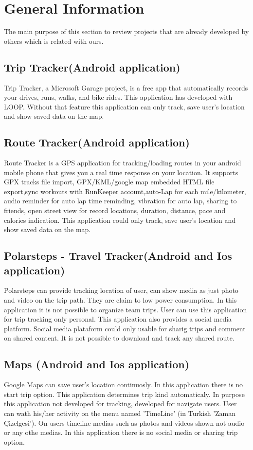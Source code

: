\chapter{General Information}
The main purpose of this section to review projects that are already developed by others which is related with ours.
\section{Trip Tracker(Android application)}
Trip Tracker, a Microsoft Garage project, is a free app that automatically records your drives, runs, walks, and bike rides. This application has developed with LOOP. Without that feature this application can only track, save user's location and show saved data on the map.

\section{Route Tracker(Android application)}
Route Tracker is a GPS application for tracking/loading routes in your android mobile phone that gives you a real time response on your location. It supports GPX tracks file import, GPX/KML/google map embedded HTML file export,sync workouts with RunKeeper account,auto-Lap for each mile/kilometer, audio reminder for auto lap time reminding, vibration for auto lap, sharing to friends, open street view for record locations, duration, distance, pace and calories indication. This application could only track, save user's location and show saved data on the map.

\section{Polarsteps - Travel Tracker(Android and Ios application)}
Polarsteps can provide tracking location of user, can show media as just photo and video on the trip path. They are claim to low power consumption. In this application it is not possible to organize team trips. User can use this application for trip tracking only personal. This application also provides a social media platform. Social media plataform could only usable for sharig trips and comment on shared content. It is not possible to download and track any shared route.

\section{Maps (Android and Ios application)}
Google Maps can save user's location continuosly. In this application there is no start trip option. This application determines trip kind automaticaly. In purpose this application not developed for tracking, developed for navigate users. User can wath his/her activity on the menu named 'TimeLine' (in Turkish 'Zaman Çizelgesi'). On users timeline medias such as photos and videos shown not audio or any othe medias. In this application there is no social media or sharing trip option.
